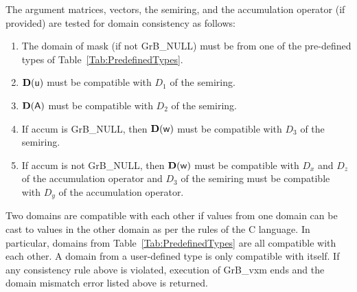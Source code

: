 The argument matrices, vectors, the semiring, and the accumulation operator (if provided) 
are tested for domain consistency as follows:
\begin{enumerate}
	\item The domain of {\sf mask} (if not {\sf GrB\_NULL}) must be from one of the pre-defined types of Table~\ref{Tab:PredefinedTypes}.

	\item $\bold{D}({\sf u})$ must be compatible with $D_1$ of the semiring.

	\item $\bold{D}({\sf A})$ must be compatible with $D_2$ of the semiring.

	\item If {\sf accum} is {\sf GrB\_NULL}, then $\bold{D}({\sf w})$ must be compatible with $D_3$ of the semiring.

	\item If {\sf accum} is not {\sf GrB\_NULL}, then $\bold{D}({\sf w})$ must be compatible with $D_x$ and $D_z$ of the 
	accumulation operator and $D_3$ of the semiring must be compatible with $D_y$ of the accumulation operator.
\end{enumerate}
Two domains are compatible with each other if values from one domain can be cast 
to values in the other domain as per the rules of the C language.
In particular, domains from Table~\ref{Tab:PredefinedTypes} are all compatible 
with each other. A domain from a user-defined type is only compatible with itself.
If any consistency rule above is violated, execution of {\sf GrB\_vxm} ends and 
the domain mismatch error listed above is returned.

